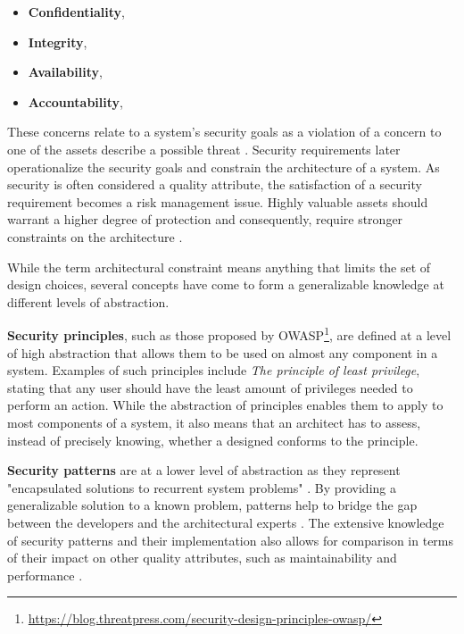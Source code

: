 \begin{itemize}
    \item \textbf{Confidentiality},  \cite{ross_systems_2018}
    \item \textbf{Integrity},  \cite{ross_systems_2018}
    \item \textbf{Availability},  \cite{ross_systems_2018}
    \item \textbf{Accountability},  \cite{ross_systems_2018}
\end{itemize}

These concerns relate to a system's security goals as a violation of a concern to one of the assets describe a possible threat \cite{haley_security_2008}. Security requirements later operationalize the security goals and constrain the architecture of a system. As security is often considered a quality attribute, the satisfaction of a security requirement becomes a risk management issue.  Highly valuable assets should warrant a higher degree of protection and consequently, require stronger constraints on the architecture \cite{broy_software_2007}.

While the term architectural constraint means anything that limits the set of design choices, several concepts have come to form a generalizable knowledge at different levels of abstraction. 

\textbf{Security principles}, such as those proposed by OWASP\footnote{\url{https://blog.threatpress.com/security-design-principles-owasp/}}, are defined at a level of high abstraction that allows them to be used on almost any component in a system. Examples of such principles include \textit{The principle of least privilege}, stating that any user should have the least amount of privileges needed to perform an action. While the abstraction of principles enables them to apply to most components of a system, it also means that an architect has to assess, instead of precisely knowing, whether a designed conforms to the principle. 

\textbf{Security patterns} are at a lower level of abstraction as they represent "encapsulated solutions to recurrent system problems" \cite{fernandez-buglioni_security_2013}. By providing a generalizable solution to a known problem, patterns help to bridge the gap between the developers and the architectural experts \cite{rosado_study_2006}. The extensive knowledge of security patterns and their implementation also allows for comparison in terms of their impact on other quality attributes, such as maintainability and performance \cite{scandariato_architecting_2009}. 

